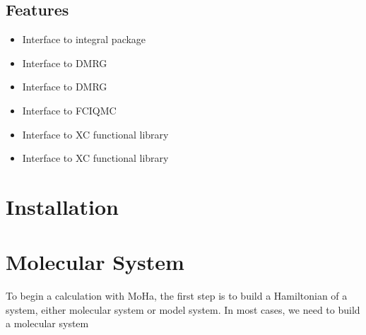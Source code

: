 \documentclass[letterpaper,10pt,english]{sphinxmanual}
\begin{document}
\subsection{Features}
\label{\detokenize{overview:features}}\begin{itemize}
\item {} 
Interface to integral package 

\item {} 
Interface to DMRG 

\item {} 
Interface to DMRG 

\item {} 
Interface to FCIQMC 

\item {} 
Interface to XC functional library 

\item {} 
Interface to XC functional library 

\end{itemize}


\section{Installation}
\label{\detokenize{installation:installation}}\label{\detokenize{installation:id1}}\label{\detokenize{installation::doc}}

\section{Molecular System}
\label{\detokenize{user_molecular_system:molecular-system}}\label{\detokenize{user_molecular_system::doc}}
To begin a calculation with MoHa, the first step is to build a Hamiltonian of a
system, either molecular system or model system. In most cases, we need to build a molecular
system
\end{document}
